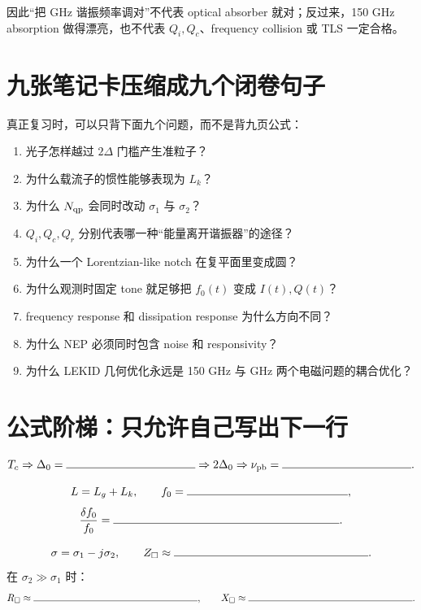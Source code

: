 \documentclass[11pt,a4paper,openany]{ctexrep}
\begin{document}
\begin{mistakebox}
因此“把 GHz 谐振频率调对”不代表 optical absorber 就对；反过来，150 GHz absorption 做得漂亮，也不代表 $Q_i,Q_c$、frequency collision 或 TLS 一定合格。
\end{mistakebox}

\section{九张笔记卡压缩成九个闭卷句子}

真正复习时，可以只背下面九个问题，而不是背九页公式：
\begin{enumerate}
  \item 光子怎样越过 $2\Delta$ 门槛产生准粒子？
  \item 为什么载流子的惯性能够表现为 $L_k$？
  \item 为什么 $N_{\rm qp}$ 会同时改动 $\sigma_1$ 与 $\sigma_2$？
  \item $Q_i,Q_c,Q_r$ 分别代表哪一种“能量离开谐振器”的途径？
  \item 为什么一个 Lorentzian-like notch 在复平面里变成圆？
  \item 为什么观测时固定 tone 就足够把 $f_0(t)$ 变成 $I(t),Q(t)$？
  \item frequency response 和 dissipation response 为什么方向不同？
  \item 为什么 NEP 必须同时包含 noise 和 responsivity？
  \item 为什么 LEKID 几何优化永远是 150 GHz 与 GHz 两个电磁问题的耦合优化？
\end{enumerate}

\section{公式阶梯：只允许自己写出下一行}

\begin{notebookbox}[title=公式阶梯 A：从 $T_c$ 到 pair breaking]
\[
T_c
\Rightarrow
\Delta_0=\rule{4cm}{0.4pt}
\Rightarrow
2\Delta_0
\Rightarrow
\nu_{\rm pb}=\rule{4cm}{0.4pt}.
\]
\end{notebookbox}

\begin{notebookbox}[title=公式阶梯 B：从 $L_k$ 到谐振频移]
\[
L=L_g+L_k,
\qquad
f_0=\rule{5cm}{0.4pt},
\]
\[
\frac{\delta f_0}{f_0}=\rule{7cm}{0.4pt}.
\]
\end{notebookbox}

\begin{notebookbox}[title=公式阶梯 C：从复电导到薄膜表面阻抗]
\[
\sigma=\sigma_1-j\sigma_2,
\qquad
Z_{\Box}\approx\rule{6cm}{0.4pt}.
\]
在 $\sigma_2\gg\sigma_1$ 时：
\[
R_{\Box}\approx\rule{6cm}{0.4pt},
\qquad
X_{\Box}\approx\rule{6cm}{0.4pt}.
\]
\end{notebookbox}
\end{document}
